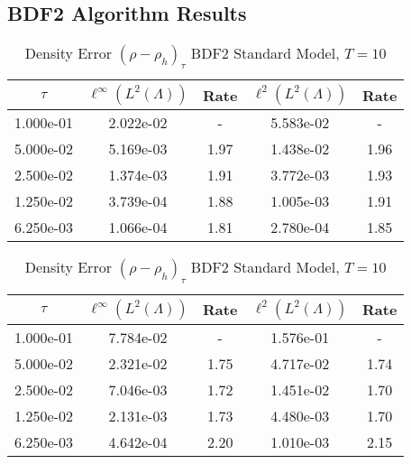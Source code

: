 \documentclass[letterpaper]{erdc}
\begin{document}
\subsection{BDF2 Algorithm Results}
\begin{table}[h!]
  \parbox{.45\linewidth}{
  \tiny
  \centering
    \caption{Density Error $(\rho - \rho_h)_{\tau}$ BDF2 Rotational Model, $T=10$}
    \begin{tabular}{c|c|c|c|c}
      $\tau$  & $\ell^{\infty}\left(L^2(\Lambda)\right)$ &  Rate  &  $\ell^2\left(L^2(\Lambda)\right)$  &  Rate\\
      \hline
      1.000e-01 & 2.022e-02 &   -  & 5.583e-02 &   - \\
      5.000e-02 & 5.169e-03 & 1.97 & 1.438e-02 & 1.96\\
      2.500e-02 & 1.374e-03 & 1.91 & 3.772e-03 & 1.93\\
      1.250e-02 & 3.739e-04 & 1.88 & 1.005e-03 & 1.91\\
      6.250e-03 & 1.066e-04 & 1.81 & 2.780e-04 & 1.85
    \end{tabular}
    }
    \hfill
    \parbox{.45\linewidth}{
    \tiny
    \centering
      \caption{Density Error $(\rho - \rho_h)_{\tau}$ BDF2 Standard Model, $T=10$}
      \begin{tabular}{c|c|c|c|c}
        $\tau$  & $\ell^{\infty}\left(L^2(\Lambda)\right)$ &  Rate  &  $\ell^2\left(L^2(\Lambda)\right)$  &  Rate\\
        \hline
        1.000e-01 & 7.784e-02 &   -  & 1.576e-01 &   - \\
        5.000e-02 & 2.321e-02 & 1.75 & 4.717e-02 & 1.74\\
        2.500e-02 & 7.046e-03 & 1.72 & 1.451e-02 & 1.70\\
        1.250e-02 & 2.131e-03 & 1.73 & 4.480e-03 & 1.70\\
        6.250e-03 & 4.642e-04 & 2.20 & 1.010e-03 & 2.15
      \end{tabular}
    }
\end{table}
\end{document}
